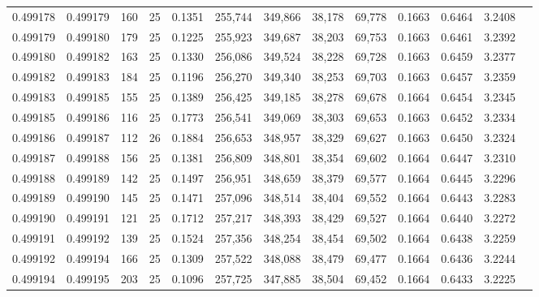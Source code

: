 \begin{tabular}{rrrrrrrrrrrrr}
0.499178 & 0.499179 & 160 &  25 &                                     0.1351 & 255,744 & 349,866 &  38,178 &  69,778 & 0.1663 & 0.6464 & 3.2408 \\
0.499179 & 0.499180 & 179 &  25 &                                     0.1225 & 255,923 & 349,687 &  38,203 &  69,753 & 0.1663 & 0.6461 & 3.2392 \\
0.499180 & 0.499182 & 163 &  25 &                                     0.1330 & 256,086 & 349,524 &  38,228 &  69,728 & 0.1663 & 0.6459 & 3.2377 \\
0.499182 & 0.499183 & 184 &  25 &                                     0.1196 & 256,270 & 349,340 &  38,253 &  69,703 & 0.1663 & 0.6457 & 3.2359 \\
0.499183 & 0.499185 & 155 &  25 &                                     0.1389 & 256,425 & 349,185 &  38,278 &  69,678 & 0.1664 & 0.6454 & 3.2345 \\
0.499185 & 0.499186 & 116 &  25 &                                     0.1773 & 256,541 & 349,069 &  38,303 &  69,653 & 0.1663 & 0.6452 & 3.2334 \\
0.499186 & 0.499187 & 112 &  26 &                                     0.1884 & 256,653 & 348,957 &  38,329 &  69,627 & 0.1663 & 0.6450 & 3.2324 \\
0.499187 & 0.499188 & 156 &  25 &                                     0.1381 & 256,809 & 348,801 &  38,354 &  69,602 & 0.1664 & 0.6447 & 3.2310 \\
0.499188 & 0.499189 & 142 &  25 &                                     0.1497 & 256,951 & 348,659 &  38,379 &  69,577 & 0.1664 & 0.6445 & 3.2296 \\
0.499189 & 0.499190 & 145 &  25 &                                     0.1471 & 257,096 & 348,514 &  38,404 &  69,552 & 0.1664 & 0.6443 & 3.2283 \\
0.499190 & 0.499191 & 121 &  25 &                                     0.1712 & 257,217 & 348,393 &  38,429 &  69,527 & 0.1664 & 0.6440 & 3.2272 \\
0.499191 & 0.499192 & 139 &  25 &                                     0.1524 & 257,356 & 348,254 &  38,454 &  69,502 & 0.1664 & 0.6438 & 3.2259 \\
0.499192 & 0.499194 & 166 &  25 &                                     0.1309 & 257,522 & 348,088 &  38,479 &  69,477 & 0.1664 & 0.6436 & 3.2244 \\
0.499194 & 0.499195 & 203 &  25 &                                     0.1096 & 257,725 & 347,885 &  38,504 &  69,452 & 0.1664 & 0.6433 & 3.2225 \\

\end{tabular}
